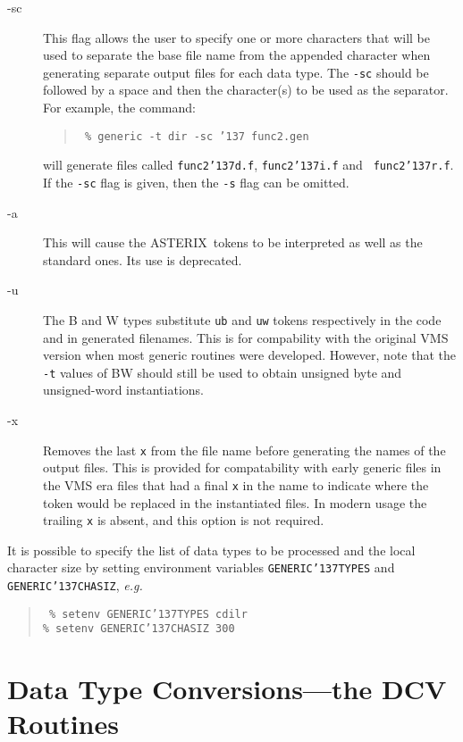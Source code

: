 \documentclass[twoside,11pt]{article}
\renewcommand{\_}{{\tt\char'137}}     %
\newcommand{\ASTERIX}{{\footnotesize ASTERIX}\normalsize}
\begin{document}
\begin{description}
\item[-sc] This flag allows the user to specify one or more characters
that will be used to separate the base file name from the appended
character when generating separate output files for each data type.
The {\tt -sc} should be followed by a space and then the character(s)
to be used as the separator.  For example, the command:

\begin{quote}{\tt
\% generic -t dir -sc \_ func2.gen
}
\end{quote}

will generate files called {\tt func2\_d.f}, {\tt func2\_i.f} and {\tt
func2\_r.f}.  If the {\tt -sc} flag is given, then the {\tt -s} flag can be
omitted.

\item[-a] This will cause the \ASTERIX\ tokens to be interpreted as well as the
standard ones.  Its use is deprecated.

\item[-u]  The B and W types substitute {\tt ub} and {\tt uw} tokens 
respectively in the code and in generated filenames.  This is for 
compability with the original VMS version when most generic routines were
developed.  However, note that the {\tt -t} values of BW should still be 
used to obtain unsigned byte and unsigned-word instantiations.

\item[-x]  Removes the last {\tt x} from the file name before generating the
names of the output files.  This is provided for compatability
with early generic files in the VMS era files that had a final {\tt x} in the
name to indicate where the token would be replaced in the
instantiated files.  In modern usage the trailing {\tt x} is absent, and
this option is not required.

\end{description}

It is possible to specify the list of data types to be processed and the local
character size by setting environment variables {\tt GENERIC\_TYPES} and {\tt
GENERIC\_CHASIZ}, \emph{e.g.}

\begin{quote}{\tt
\% setenv GENERIC\_TYPES cdilr \\
\% setenv GENERIC\_CHASIZ 300
}
\end{quote}

\section{Data Type Conversions---the DCV Routines}
\end{document}
